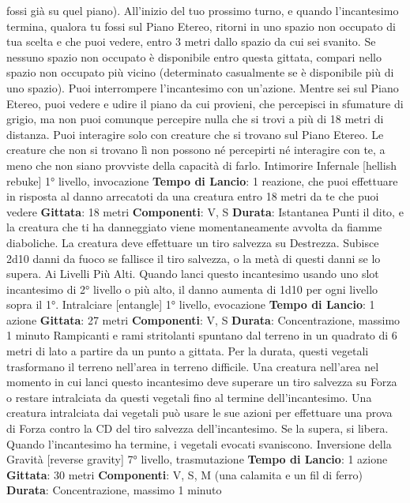 \begin{multicols}{2}
fossi già su quel piano). All’inizio del tuo prossimo
turno, e quando l’incantesimo termina, qualora tu fossi
sul Piano Etereo, ritorni in uno spazio non occupato di
tua scelta e che puoi vedere, entro 3 metri dallo spazio
da cui sei svanito. Se nessuno spazio non occupato è
disponibile entro questa gittata, compari nello spazio
non occupato più vicino (determinato casualmente se è
disponibile più di uno spazio). Puoi interrompere
l’incantesimo con un’azione.
Mentre sei sul Piano Etereo, puoi vedere e udire il
piano da cui provieni, che percepisci in sfumature di
grigio, ma non puoi comunque percepire nulla che si
trovi a più di 18 metri di distanza. Puoi interagire solo
con creature che si trovano sul Piano Etereo. Le
creature che non si trovano lì non possono né percepirti
né interagire con te, a meno che non siano provviste
della capacità di farlo.
Intimorire Infernale
[hellish rebuke]
1° livello, invocazione
\textbf{Tempo di Lancio}: 1 reazione, che puoi effettuare in
risposta al danno arrecatoti da una creatura entro 18
metri da te che puoi vedere
\textbf{Gittata}: 18 metri
\textbf{Componenti}: V, S
\textbf{Durata}: Istantanea
Punti il dito, e la creatura che ti ha danneggiato viene
momentaneamente avvolta da fiamme diaboliche. La
creatura deve effettuare un tiro salvezza su Destrezza.
Subisce 2d10 danni da fuoco se fallisce il tiro salvezza,
o la metà di questi danni se lo supera.
Ai Livelli Più Alti. Quando lanci questo incantesimo
usando uno slot incantesimo di 2° livello o più alto, il
danno aumenta di 1d10 per ogni livello sopra il 1°.
Intralciare
[entangle]
1° livello, evocazione
\textbf{Tempo di Lancio}: 1 azione
\textbf{Gittata}: 27 metri
\textbf{Componenti}: V, S
\textbf{Durata}: Concentrazione, massimo 1 minuto
Rampicanti e rami stritolanti spuntano dal terreno in un
quadrato di 6 metri di lato a partire da un punto a
gittata. Per la durata, questi vegetali trasformano il
terreno nell’area in terreno difficile.
Una creatura nell’area nel momento in cui lanci questo
incantesimo deve superare un tiro salvezza su Forza o
restare intralciata da questi vegetali fino al termine
dell’incantesimo. Una creatura intralciata dai vegetali
può usare le sue azioni per effettuare una prova di
Forza contro la CD del tiro salvezza dell’incantesimo.
Se la supera, si libera.
Quando l’incantesimo ha termine, i vegetali evocati
svaniscono.
Inversione della Gravità
[reverse gravity]
7° livello, trasmutazione
\textbf{Tempo di Lancio}: 1 azione
\textbf{Gittata}: 30 metri
\textbf{Componenti}: V, S, M (una calamita e un fil di ferro)
\textbf{Durata}: Concentrazione, massimo 1 minuto

\end{multicols}
